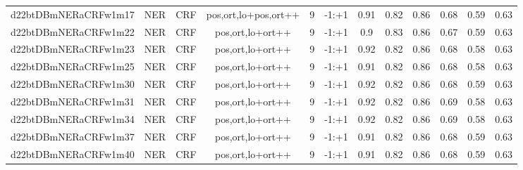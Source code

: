 \documentclass[a4paper]{article}
\begin{document}
\begin{landscape}
\begin{center}
\begin{tabular}{ |c|c|c|c|c|c|c|c|c|c|c|c|}
 	
 
 	
 		
 		\small{ d22btDBmNERaCRFw1m17 } & NER & CRF & pos,ort,lo+pos,ort++  &  9 &  -1:+1  &  0.91 & 0.82 & 0.86  &  0.68 & 0.59 & 0.63 \\
 		

 	
 
 	
 		
 		\small{ d22btDBmNERaCRFw1m22 } & NER & CRF & pos,ort,lo+ort++  &  9 &  -1:+1  &  0.9 & 0.83 & 0.86  &  0.67 & 0.59 & 0.63 \\
 		

 	
 
 	
 		
 		\small{ d22btDBmNERaCRFw1m23 } & NER & CRF & pos,ort,lo+ort++  &  9 &  -1:+1  &  0.92 & 0.82 & 0.86  &  0.68 & 0.58 & 0.63 \\
 		

 	
 
 	
 		
 		\small{ d22btDBmNERaCRFw1m25 } & NER & CRF & pos,ort,lo+ort++  &  9 &  -1:+1  &  0.91 & 0.82 & 0.86  &  0.68 & 0.58 & 0.63 \\
 		

 	
 
 	
 		
 		\small{ d22btDBmNERaCRFw1m30 } & NER & CRF & pos,ort,lo+ort++  &  9 &  -1:+1  &  0.92 & 0.82 & 0.86  &  0.68 & 0.59 & 0.63 \\
 		

 	
 
 	
 		
 		\small{ d22btDBmNERaCRFw1m31 } & NER & CRF & pos,ort,lo+ort++  &  9 &  -1:+1  &  0.92 & 0.82 & 0.86  &  0.69 & 0.58 & 0.63 \\
 		

 	
 
 	
 		
 		\small{ d22btDBmNERaCRFw1m34 } & NER & CRF & pos,ort,lo+ort++  &  9 &  -1:+1  &  0.92 & 0.82 & 0.86  &  0.69 & 0.58 & 0.63 \\
 		

 	
 
 	
 		
 		\small{ d22btDBmNERaCRFw1m37 } & NER & CRF & pos,ort,lo+ort++  &  9 &  -1:+1  &  0.91 & 0.82 & 0.86  &  0.68 & 0.59 & 0.63 \\
 		

 	
 
 	
 		
 		\small{ d22btDBmNERaCRFw1m40 } & NER & CRF & pos,ort,lo+ort++  &  9 &  -1:+1  &  0.91 & 0.82 & 0.86  &  0.68 & 0.59 & 0.63 \\
 		


\end{tabular}
\end{center}
\end{landscape}
\end{document}
